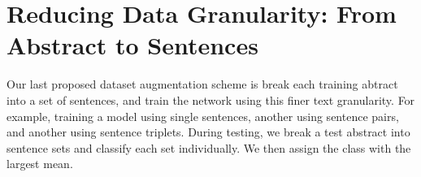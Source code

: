 \section{Reducing Data Granularity: From Abstract to Sentences}
Our last proposed dataset augmentation scheme is break each training abtract into a set of sentences, and train
the network using this finer text granularity. For example, training a model using single sentences, another using sentence pairs,
and another using sentence triplets.
During testing, we break a test abstract into sentence sets and classify each set individually. We then assign
the class with the largest mean.
